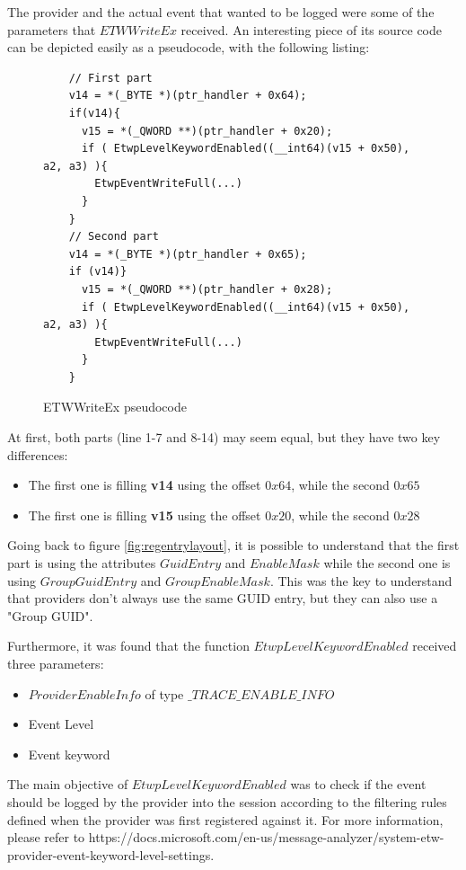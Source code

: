 The provider and the actual event that wanted to be logged were some of the parameters that $ETWWriteEx$ received. An interesting piece of its source code can be depicted easily as a pseudocode, with the following listing: 

\begin{figure}[H]
  \begin{lstlisting}
    // First part
    v14 = *(_BYTE *)(ptr_handler + 0x64);
    if(v14){
      v15 = *(_QWORD **)(ptr_handler + 0x20);
      if ( EtwpLevelKeywordEnabled((__int64)(v15 + 0x50), a2, a3) ){
        EtwpEventWriteFull(...)
      }
    }
    // Second part
    v14 = *(_BYTE *)(ptr_handler + 0x65); 
    if (v14)}
      v15 = *(_QWORD **)(ptr_handler + 0x28);
      if ( EtwpLevelKeywordEnabled((__int64)(v15 + 0x50), a2, a3) ){
        EtwpEventWriteFull(...)
      }
    }
  \end{lstlisting} 
  \caption[]{ETWWriteEx pseudocode }
  \label{fig:etw_write_ex_pseudocode}
\end{figure}

At first, both parts (line 1-7 and 8-14) may seem equal, but they have two key differences: 
\begin{itemize}
\setlength\itemsep{0.05em}
  \item The first one is filling {\bfseries v14} using the offset $0x64$, while the second $0x65$
  \item The first one is filling {\bfseries v15} using the offset $0x20$, while the second $0x28$
\end{itemize}

Going back to figure \ref{fig:regentrylayout}, it is possible to understand that the first part is using the attributes $GuidEntry$ and $EnableMask$ while the second one is using $GroupGuidEntry$ and $GroupEnableMask$. This was the key to understand that providers don't always use the same GUID entry, but they can also use a "Group GUID".

Furthermore, it was found that the function $EtwpLevelKeywordEnabled$ received three parameters: 
\begin{itemize}
\setlength\itemsep{0.05em}
  \item $ProviderEnableInfo$ of type $\_TRACE\_ENABLE\_INFO$
  \item Event Level
  \item Event keyword
\end{itemize}

The main objective of $EtwpLevelKeywordEnabled$ was to check if the event should be logged by the provider into the session according to the filtering rules defined when the provider was first registered against it. For more information, please refer to https://docs.microsoft.com/en-us/message-analyzer/system-etw-provider-event-keyword-level-settings. 


